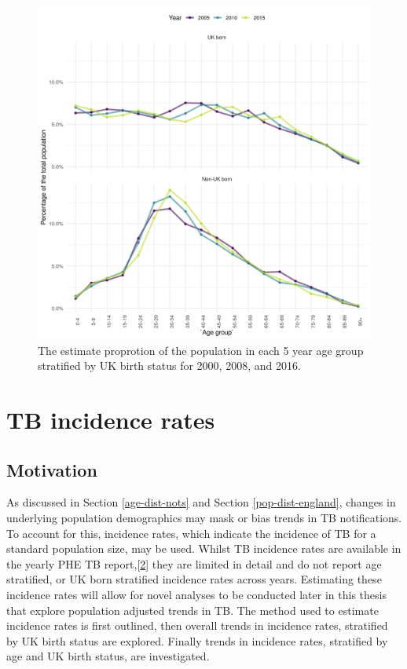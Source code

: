 \documentclass[11pt,twoside]{bristolthesis}
\begin{document}
  \newpage
  \begin{figure}
  
  {\centering \includegraphics[width=0.8\linewidth,]{chapters/tb-epi-england/figures/age-dist-pop} 
  
  }
  
  \caption[The estimated proprotion of the population in each 5 year age group stratified by UK birth status for 2000, 2008, and 2016.]{The estimate proprotion of the population in each 5 year age group stratified by UK birth status for 2000, 2008, and 2016.}\label{fig:age-dist-pop}
  \end{figure}
  \hypertarget{tb-inc-rates-epi}{%
  \section{TB incidence rates}\label{tb-inc-rates-epi}}
  
  \hypertarget{motivation}{%
  \subsection{Motivation}\label{motivation}}
  
  As discussed in Section \ref{age-dist-nots} and Section \ref{pop-dist-england}, changes in underlying population demographics may mask or bias trends in TB notifications. To account for this, incidence rates, which indicate the incidence of TB for a standard population size, may be used. Whilst TB incidence rates are available in the yearly PHE TB report,{[}\protect\hyperlink{ref-PHE2017}{2}{]} they are limited in detail and do not report age stratified, or UK born stratified incidence rates across years. Estimating these incidence rates will allow for novel analyses to be conducted later in this thesis that explore population adjusted trends in TB. The method used to estimate incidence rates is first outlined, then overall trends in incidence rates, stratified by UK birth status are explored. Finally trends in incidence rates, stratified by age and UK birth status, are investigated.
  
\end{document}
